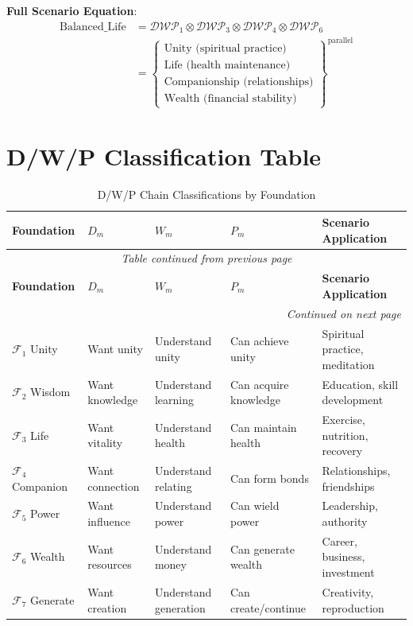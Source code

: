\documentclass[11pt,twoside]{book}
\renewcommand{\arraystretch}{1.2}  %
\newcommand{\Foundations}{\mathcal{F}}
\newcommand{\DWP}{\mathcal{DWP}}
\begin{document}
\textbf{Full Scenario Equation}:
\begin{align}
    \text{Balanced\_Life} &= \DWP_1 \otimes \DWP_3 \otimes \DWP_4 \otimes \DWP_6 \\
    &= \left\{
    \begin{array}{l}
        \text{Unity (spiritual practice)} \\
        \text{Life (health maintenance)} \\
        \text{Companionship (relationships)} \\
        \text{Wealth (financial stability)}
    \end{array}
    \right\}^{\text{parallel}}
\end{align}

\section{D/W/P Classification Table}

\begin{center}
\small
\renewcommand{\arraystretch}{1.3}
\begin{longtable}{p{1.5cm}|p{1.5cm}|p{1.5cm}|p{1.5cm}|p{3.5cm}}
\caption{D/W/P Chain Classifications by Foundation} \\
\toprule
\textbf{Foundation} & \textbf{$D_m$} & \textbf{$W_m$} & \textbf{$P_m$} & \textbf{Scenario Application} \\
\midrule
\endfirsthead
\multicolumn{5}{c}{\textit{Table continued from previous page}} \\
\toprule
\textbf{Foundation} & \textbf{$D_m$} & \textbf{$W_m$} & \textbf{$P_m$} & \textbf{Scenario Application} \\
\midrule
\endhead
\midrule
\multicolumn{5}{r}{\textit{Continued on next page}} \\
\endfoot
\bottomrule
\endlastfoot
$\Foundations_1$ Unity & Want unity & Understand unity & Can achieve unity & Spiritual practice, meditation \\
$\Foundations_2$ Wisdom & Want knowledge & Understand learning & Can acquire knowledge & Education, skill development \\
$\Foundations_3$ Life & Want vitality & Understand health & Can maintain health & Exercise, nutrition, recovery \\
$\Foundations_4$ Companion & Want connection & Understand relating & Can form bonds & Relationships, friendships \\
$\Foundations_5$ Power & Want influence & Understand power & Can wield power & Leadership, authority \\
$\Foundations_6$ Wealth & Want resources & Understand money & Can generate wealth & Career, business, investment \\
$\Foundations_7$ Generate & Want creation & Understand generation & Can create/continue & Creativity, reproduction \\
\end{longtable}
\end{center}
\end{document}
